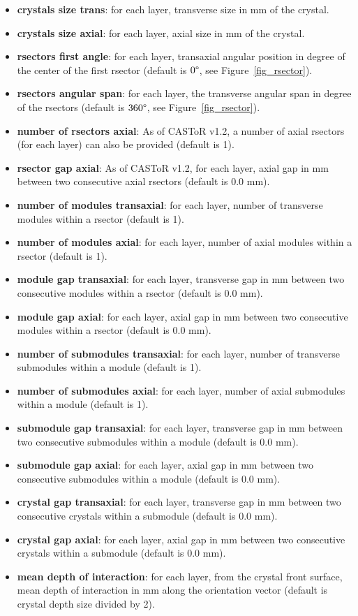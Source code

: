 \documentclass[a4paper, 11pt]{article}
\begin{document}
\begin{itemize}
  \item \textbf{crystals size trans}: for each layer, transverse size in mm of the crystal.
  \item \textbf{crystals size axial}: for each layer, axial size in mm of the crystal.
  \item \textbf{rsectors first angle}: for each layer, transaxial angular position in degree of the center of the first rsector (default is $0\degree$,
        see Figure~\ref{fig_rsector}).
  \item \textbf{rsectors angular span}: for each layer, the transverse angular span in degree of the rsectors  (default is $360\degree$, see
        Figure~\ref{fig_rsector}).        
  \item \textbf{number of rsectors axial}: As of CASToR v1.2, a number of axial rsectors (for each layer) can also be provided (default is 1).
  \item \textbf{rsector gap axial}:  As of CASToR v1.2, for each layer, axial gap in mm between two consecutive axial rsectors (default is 0.0 mm).
  \item \textbf{number of modules transaxial}: for each layer, number of transverse modules within a rsector (default is 1).
  \item \textbf{number of modules axial}: for each layer, number of axial modules within a rsector (default is 1).
  \item \textbf{module gap transaxial}: for each layer, transverse gap in mm between two consecutive modules within a rsector (default is 0.0 mm).
  \item \textbf{module gap axial}: for each layer, axial gap in mm between two consecutive modules within a rsector (default is 0.0 mm).
  \item \textbf{number of submodules transaxial}: for each layer, number of transverse submodules within a module (default is 1).
  \item \textbf{number of submodules axial}: for each layer, number of axial submodules within a module (default is 1).
  \item \textbf{submodule gap transaxial}: for each layer, transverse gap in mm between two consecutive submodules within a module (default is 0.0 mm).
  \item \textbf{submodule gap axial}: for each layer, axial gap in mm between two consecutive submodules within a module (default is 0.0 mm).
  \item \textbf{crystal gap transaxial}: for each layer, transverse gap in mm between two consecutive crystals within a submodule (default is 0.0 mm).
  \item \textbf{crystal gap axial}: for each layer, axial gap in mm between two consecutive crystals within a submodule (default is 0.0 mm).
  \item \textbf{mean depth of interaction}: for each layer, from the crystal front surface, mean depth of interaction in mm along the orientation vector
        (default is crystal depth size divided by 2).
\end{itemize}
\end{document}
